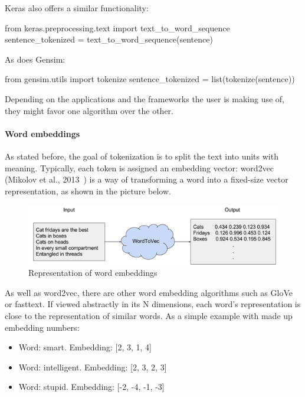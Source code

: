 Keras also offers a similar functionality:

\begin{python}
from keras.preprocessing.text import text_to_word_sequence
sentence_tokenized = text_to_word_sequence(sentence)
\end{python}

As does Gensim:

\begin{python}
from gensim.utils import tokenize
sentence_tokenized = list(tokenize(sentence))
\end{python}

Depending on the applications and the frameworks the user is making use of, they might favor one algorithm over the other.

\paragraph{Word embeddings}\label{subsec:wordemb}

As stated before, the goal of tokenization is to split the text into units with meaning. Typically, each token is assigned an embedding vector: word2vec (Mikolov et al., 2013~\cite{mikolov2013efficient}) is a way of transforming a word into a fixed-size vector representation, as shown in the picture below.

\begin{figure}[!ht]
    \centering
    \includegraphics[width=14cm]{figures/word_emb.png}
    \caption{Representation of word embeddings}
\end{figure}

As well as word2vec, there are other word embedding algorithms such as GloVe or fasttext. If viewed abstractly in its N dimensions, each word's representation is close to the representation of similar words. As a simple example with made up embedding numbers:

\begin{itemize}
    \item Word: smart. Embedding: [2, 3, 1, 4]
    \item Word: intelligent. Embedding: [2, 3, 2, 3]
    \item Word: stupid. Embedding: [-2, -4, -1, -3]
\end{itemize}


